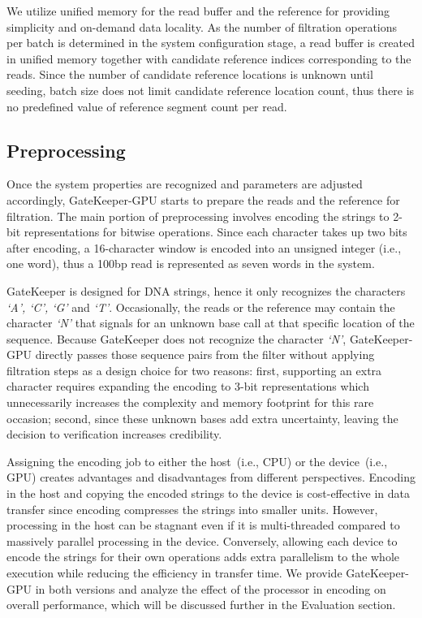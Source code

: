 We utilize unified memory for the read buffer and the reference for providing simplicity and on-demand data locality. As the number of filtration operations per batch is determined in the system configuration stage, a read buffer is created in unified memory together with candidate reference indices corresponding to the reads. Since the number of candidate reference locations is unknown until seeding, batch size does not limit candidate reference location count, thus there is no predefined value of reference segment count per read.     

\subsection{Preprocessing}
Once the system properties are recognized and parameters are adjusted accordingly, GateKeeper-GPU starts to prepare the reads and the reference for filtration. The main portion of preprocessing involves encoding the strings to 2-bit representations for bitwise operations. Since each character takes up two bits after encoding, a 16-character window is encoded into an unsigned integer (i.e., one word), thus a 100bp read is represented as seven words in the system.    

GateKeeper is designed for DNA strings, hence it only recognizes the characters \textit{`A', `C', `G'} and \textit{`T'}. Occasionally, the reads or the reference may contain the character \textit{`N'} that signals for an unknown base call at that specific location of the sequence. Because GateKeeper does not recognize the character \textit{`N'}, GateKeeper-GPU directly passes those sequence pairs from the filter without applying filtration steps as a design choice for two reasons: first, supporting an extra character requires expanding the encoding to 3-bit representations which unnecessarily increases the complexity and memory footprint for this rare occasion; second, since these unknown bases add extra uncertainty, leaving the decision to verification increases credibility. 

Assigning the encoding job to either the host~(i.e., CPU) or the device~(i.e., GPU) creates advantages and disadvantages from different perspectives. Encoding in the host and copying the encoded strings to the device is cost-effective in data transfer since encoding compresses the strings into smaller units. However, processing in the host can be stagnant even if it is multi-threaded compared to massively parallel processing in the device. Conversely, allowing each device to encode the strings for their own operations adds extra parallelism to the whole execution while reducing the efficiency in transfer time. We provide GateKeeper-GPU in both versions and analyze the effect of the processor in encoding on overall performance, which will be discussed further in the Evaluation section.

